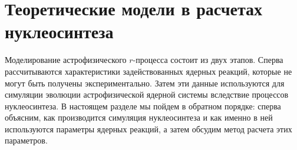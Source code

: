 \section{Теоретические модели в расчетах нуклеосинтеза} \label{theormodels}
Моделирование астрофизического $r$-процесса состоит из двух этапов. Сперва рассчитываются характеристики задействованных ядерных реакций, которые не могут быть получены экспериментально. Затем эти данные используются для симуляции эволюции астрофизической ядерной системы вследствие процессов нуклеосинтеза. В настоящем разделе мы пойдем в обратном порядке: сперва объясним, как производится симуляция нуклеосинтеза и как именно в ней используются параметры ядерных реакций, а затем обсудим метод расчета этих параметров.




